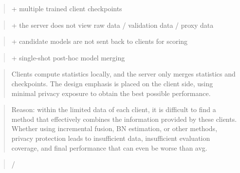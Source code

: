 \documentclass[letterpaper]{article}
\begin{document}
\begin{quote}\small + multiple trained client checkpoints\end{quote}

\begin{quote}\small + the server does not view raw data / validation data / proxy data\end{quote}

\begin{quote}\small + candidate models are not sent back to clients for scoring\end{quote}

\begin{quote}\small + single-shot post-hoc model merging\end{quote}

\begin{quote}\small Clients compute statistics locally, and the server only merges statistics and checkpoints. The design emphasis is placed on the client side, using minimal privacy exposure to obtain the best possible performance.\end{quote}

\begin{quote}\small Reason: within the limited data of each client, it is difficult to find a method that effectively combines the information provided by these clients. Whether using incremental fusion, BN estimation, or other methods, privacy protection leads to insufficient data, insufficient evaluation coverage, and final performance that can even be worse than avg.\end{quote}

\begin{quote}\small */\end{quote}

\end{document}
